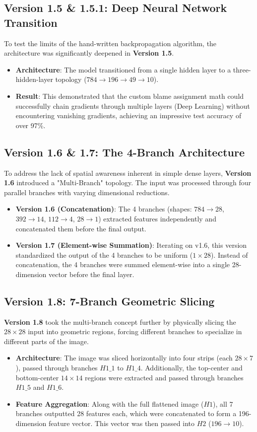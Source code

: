 \documentclass[12pt,a4paper]{article}
\begin{document}
\subsection{Version 1.5 \& 1.5.1: Deep Neural Network Transition}
To test the limits of the hand-written backpropagation algorithm, the architecture was significantly deepened in \textbf{Version 1.5}.
\begin{itemize}
    \item \textbf{Architecture}: The model transitioned from a single hidden layer to a three-hidden-layer topology ($784 \to 196 \to 49 \to 10$).
    \item \textbf{Result}: This demonstrated that the custom blame assignment math could successfully chain gradients through multiple layers (Deep Learning) without encountering vanishing gradients, achieving an impressive test accuracy of over 97\%.
\end{itemize}

\subsection{Version 1.6 \& 1.7: The 4-Branch Architecture}
To address the lack of spatial awareness inherent in simple dense layers, \textbf{Version 1.6} introduced a "Multi-Branch" topology. The input was processed through four parallel branches with varying dimensional reductions.
\begin{itemize}
    \item \textbf{Version 1.6 (Concatenation)}: The 4 branches (shapes: $784 \to 28$, $392 \to 14$, $112 \to 4$, $28 \to 1$) extracted features independently and concatenated them before the final output.
    \item \textbf{Version 1.7 (Element-wise Summation)}: Iterating on v1.6, this version standardized the output of the 4 branches to be uniform ($1 \times 28$). Instead of concatenation, the 4 branches were summed element-wise into a single 28-dimension vector before the final layer.
\end{itemize}

\subsection{Version 1.8: 7-Branch Geometric Slicing}
\textbf{Version 1.8} took the multi-branch concept further by physically slicing the $28 \times 28$ input into geometric regions, forcing different branches to specialize in different parts of the image.
\begin{itemize}
    \item \textbf{Architecture}: The image was sliced horizontally into four strips (each $28 \times 7$), passed through branches $H1\_1$ to $H1\_4$. Additionally, the top-center and bottom-center $14 \times 14$ regions were extracted and passed through branches $H1\_5$ and $H1\_6$. 
    \item \textbf{Feature Aggregation}: Along with the full flattened image ($H1$), all 7 branches outputted 28 features each, which were concatenated to form a 196-dimension feature vector. This vector was then passed into $H2$ ($196 \to 10$).
\end{itemize}
\end{document}

